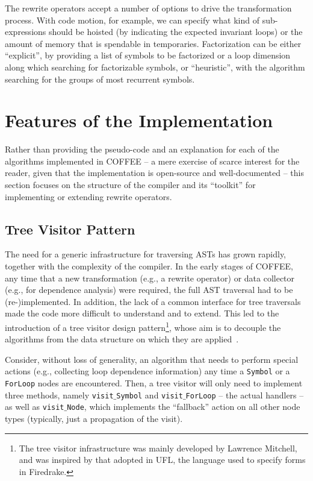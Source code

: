 The rewrite operators accept a number of options to drive the transformation process. With code motion, for example, we can specify what kind of sub-expressions should be hoisted (by indicating the expected invariant loops) or the amount of memory that is spendable in temporaries. Factorization can be either ``explicit'', by providing a list of symbols to be factorized or a loop dimension along which searching for factorizable symbols, or ``heuristic'', with the algorithm searching for the groups of most recurrent symbols.

\section{Features of the Implementation}
Rather than providing the pseudo-code and an explanation for each of the algorithms implemented in COFFEE -- a mere exercise of scarce interest for the reader, given that the implementation is open-source and well-documented -- this section focuses on the structure of the compiler and its ``toolkit'' for implementing or extending rewrite operators.

\subsection{Tree Visitor Pattern}
The need for a generic infrastructure for traversing ASTs has grown rapidly, together with the complexity of the compiler. In the early stages of COFFEE, any time that a new transformation (e.g., a rewrite operator) or data collector (e.g., for dependence analysis) were required, the full AST traversal had to be (re-)implemented. In addition, the lack of a common interface for tree traversals made the code more difficult to understand and to extend. This led to the introduction of a tree visitor design pattern\footnote{The tree visitor infrastructure was mainly developed by Lawrence Mitchell, and was inspired by that adopted in UFL, the language used to specify forms in Firedrake.}, whose aim is to decouple the algorithms from the data structure on which they are applied~\cite{wiki-tree-visitors}. 

Consider, without loss of generality, an algorithm that needs to perform special actions (e.g., collecting loop dependence information) any time a \texttt{Symbol} or a \texttt{ForLoop} nodes are encountered. Then, a tree visitor will only need to implement three methods, namely \texttt{visit$\_$Symbol} and \texttt{visit$\_$ForLoop} -- the actual handlers -- as well as \texttt{visit$\_$Node}, which implements the ``fallback'' action on all other node types (typically, just a propagation of the visit).

